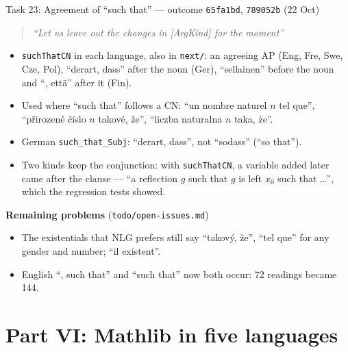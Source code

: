 \documentclass[10pt,aspectratio=169]{beamer}
\newcommand{\bad}[1]{\textcolor{warn}{#1}}
\newcommand{\ok}[1]{\textcolor{good}{#1}}
\newcommand{\commit}[1]{\texttt{\footnotesize #1}}
\newcommand{\prompt}[1]{\begin{quote}\small\itshape ``#1''\end{quote}}
\begin{document}
\begin{frame}{Task 23: Agreement of ``such that'' --- outcome}
  \commit{65fa1bd}, \commit{789052b} (22 Oct)
  \prompt{Let us leave out the changes in [ArgKind] for the moment}
  \begin{itemize}\small
    \item \texttt{suchThatCN} in each language, also in \texttt{next/}: an agreeing AP
          (Eng, Fre, Swe, Cze, Pol), ``derart, dass'' after the noun (Ger),
          ``sellainen'' before the noun and ``, että'' after it (Fin).
    \item Used where ``such that'' follows a CN: \ok{``un nombre naturel $n$ tel que'',
          ``přirozené číslo $n$ takové, že'', ``liczba naturalna $n$ taka, że''}.
    \item German \texttt{such\_that\_Subj}: ``derart, dass'', not ``sodass'' (``so
          that'').
    \item Two kinds keep the conjunction: with \texttt{suchThatCN}, a variable added
          later came after the clause --- \bad{``a reflection $g$ such that $g$ is left
          $x_0$ such that \dots''}, which the regression tests showed.
  \end{itemize}
  \textbf{Remaining problems} (\texttt{todo/open-issues.md})
  \begin{itemize}\small
    \item The existentials that NLG prefers still say \bad{``takový, že''},
          \bad{``tel que''} for any gender and number; ``il \bad{existent}''.
    \item English ``, such that'' and ``such that'' now both occur: 72 readings became 144.
  \end{itemize}
\end{frame}

\section{Part VI: Mathlib in five languages}
\end{document}
